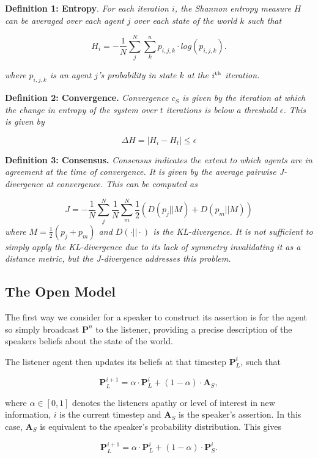 \textbf{Definition 1: Entropy}. \textit{For each iteration $i$, the Shannon entropy measure $H$ can be averaged over each agent $j$ over each state of the world $k$ such that}

\begin{equation}\label{eq:shannon_entropy}
    H_i = - \frac{1}{N} \sum_j^N \sum_k^n p_{i, j, k} \cdot log(p_{i,j, k}).
\end{equation}

\textit{where $p_{i,j,k}$ is an agent $j$'s probability in state $k$ at the $i^\textnormal{th}$ iteration.}~\cite{Shannon1948ACommunication}


\textbf{Definition 2: Convergence. } \textit{Convergence $c_S$ is given by the iteration at which the change in entropy of the system over $t$ iterations is below a threshold $\epsilon$. This is given by}

\begin{equation}
    \Delta H = |H_i - H_t| \leq \epsilon
\end{equation}


\textbf{Definition 3: Consensus. } \textit{Consensus indicates the extent to which agents are in agreement at the time of convergence. It is given by the average pairwise J-divergence at convergence. This can be computed as}

\begin{equation}
    J = -\frac{1}{N}\sum_j^N \frac{1}{N} \sum_m^N \frac{1}{2} (D(p_{j}||M) + D(p_{m}||M)) 
\end{equation}
\textit{where $M = \frac{1}{2} (p_{j} + p_{m})$ and $D(\cdot || \cdot)$ is the KL-divergence. It is not sufficient to simply apply the KL-divergence due to its lack of symmetry invalidating it as a distance metric, but the J-divergence addresses this problem\cite{JohnsonSymmetrizingDistance}.} 

\subsection{The Open Model}
The first way we consider for a speaker to construct its assertion is for the agent so simply broadcast $\mathbf{P}^n$ to the listener, providing a precise description of the speakers beliefs about the state of the world. 

The listener agent then updates its beliefs at that timestep $\mathbf{P}^t_L$, such that

\begin{equation} \label{eq:simple_update_rule}
    \mathbf{P}^{i+1}_L = \alpha \cdot \mathbf{P}^{i}_L + (1 - \alpha) \cdot \mathbf{A}_S,
\end{equation}

where $\alpha \in [0, 1] $ denotes the listeners apathy or level of interest in new information, $i$ is the current timestep and $\mathbf{A}_S$ is the speaker's assertion. In this case, $\mathbf{A}_S$ is equivalent to the speaker's probability distribution. This gives

\begin{equation}
        \mathbf{P}^{i+1}_L = \alpha \cdot \mathbf{P}^{i}_L + (1 - \alpha) \cdot \mathbf{P}^{i}_S. \label{eq:fp_open}
\end{equation} 

